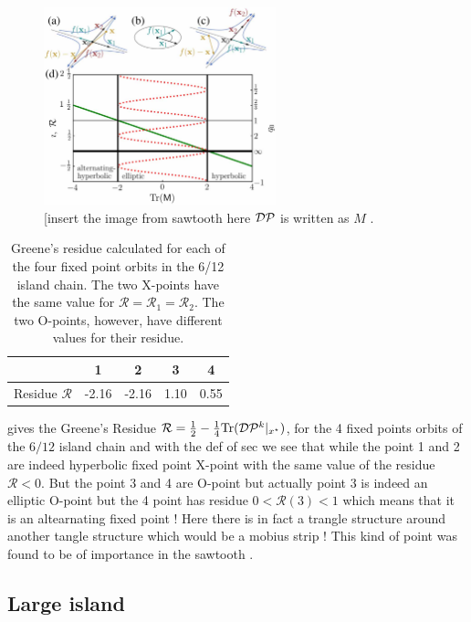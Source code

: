 \begin{figure}[H]
    \centering
    \includegraphics[width=0.6\textwidth]{images/theory/smeit_sawtooth.jpg}
    \caption{[insert the image from sawtooth here $\mathcal{D}\mathcal{P}$ is written as $M$ \cite{smiet_bifurcations_2020}.}
    \label{fig:smeit-bifurcations}
\end{figure}

\begin{table}[H]
    \centering
    \begin{tabular}{c|c|c|c|c}
         & 1 & 2 & 3 & 4 \\
         \hline Residue $\mathcal{R}$ & -2.16 & -2.16 & 1.10 & 0.55
    \end{tabular}
    \caption{Greene's residue calculated for each of the four fixed point orbits in the 6/12 island chain. The two X-points have the same value for $\mathcal{R} = \mathcal{R}_1 = \mathcal{R}_2$. The two O-points, however, have different values for their residue.}
    \label{tab:greenes}
\end{table}

 gives the Greene's Residue $\mathcal{R} = \frac{1}{2} - \frac{1}{4}\text{Tr}(\mathcal{D}\mathcal{P}^k\vert_{x^\star})$, for the 4 fixed points orbits of the $6/12$ island chain and with the def of sec we see that while the point 1 and 2 are indeed hyperbolic fixed point X-point with the same value of the residue $\mathcal{R} < 0$. But the point 3 and 4 are O-point but actually point 3 is indeed an elliptic O-point but the 4 point has residue $0 < \mathcal{R}(3) < 1$ which means that it is an altearnating fixed point ! Here there is in fact a trangle structure around another tangle structure which would be a mobius strip ! This kind of point was found to be of importance in the sawtooth \cite{smiet_bifurcations_2020}.

\subsection{Large island}\label{sec:quars-1329594}

